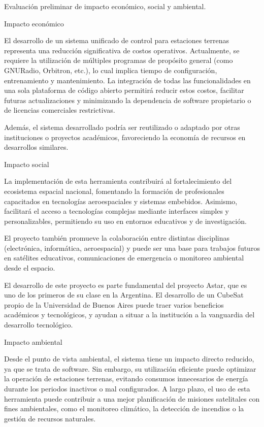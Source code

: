 
Evaluación preliminar de impacto económico, social y ambiental.

Impacto económico

El desarrollo de un sistema unificado de control para estaciones terrenas representa una reducción significativa de costos operativos. Actualmente, se requiere la utilización de múltiples programas de propósito general (como GNURadio, Orbitron, etc.), lo cual implica tiempo de configuración, entrenamiento y mantenimiento. La integración de todas las funcionalidades en una sola plataforma de código abierto permitirá reducir estos costos, facilitar futuras actualizaciones y minimizando la dependencia de software propietario o de licencias comerciales restrictivas.

Además, el sistema desarrollado podría ser reutilizado o adaptado por otras instituciones o proyectos académicos, favoreciendo la economía de recursos en desarrollos similares.

Impacto social

La implementación de esta herramienta contribuirá al fortalecimiento del ecosistema espacial nacional, fomentando la formación de profesionales capacitados en tecnologías aeroespaciales y sistemas embebidos. Asimismo, facilitará el acceso a tecnologías complejas mediante interfaces simples y personalizables, permitiendo su uso en entornos educativos y de investigación.

El proyecto también promueve la colaboración entre distintas disciplinas (electrónica, informática, aeroespacial) y puede ser una base para trabajos futuros en satélites educativos, comunicaciones de emergencia o monitoreo ambiental desde el espacio.

El desarrollo de este proyecto es parte fundamental del proyecto Astar, que es uno de los primeros de su clase en la Argentina. El desarrollo de un CubeSat propio de la Universidad de Buenos Aires puede traer varios beneficios académicos y tecnológicos, y ayudan a situar a la institución a la vanguardia del desarrollo tecnológico.

Impacto ambiental

Desde el punto de vista ambiental, el sistema tiene un impacto directo reducido, ya que se trata de software. Sin embargo, su utilización eficiente puede optimizar la operación de estaciones terrenas, evitando consumos innecesarios de energía durante los periodos inactivos o mal configurados. A largo plazo, el uso de esta herramienta puede contribuir a una mejor planificación de misiones satelitales con fines ambientales, como el monitoreo climático, la detección de incendios o la gestión de recursos naturales.
